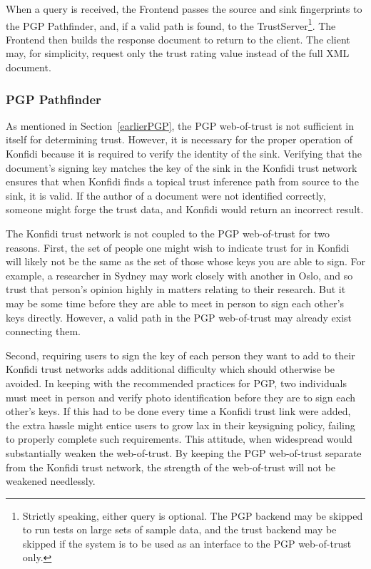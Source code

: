 \documentclass{acm_proc_article-sp}
\begin{document}
When a query is received, the Frontend passes the source and sink fingerprints to the PGP Pathfinder, and, if a valid path is found, to the TrustServer\footnote{Strictly speaking, either query is optional.  The PGP backend may be skipped to run tests on large sets of sample data, and the trust backend may be skipped if the system is to be used as an interface to the PGP web-of-trust only.}.  The Frontend then builds the response document to return to the client.  The client may, for simplicity, request only the trust rating value instead of the full XML document.

\subsubsection{PGP Pathfinder}
As mentioned in Section~\ref{earlierPGP}, the PGP web-of-trust is not sufficient in itself for determining trust.  However, it is necessary for the proper operation of Konfidi because it is required to verify the identity of the sink.  Verifying that the document's signing key matches the key of the sink in the Konfidi trust network ensures that when Konfidi finds a topical trust inference path from source to the sink, it is valid.  If the author of a document were not identified correctly, someone might forge the trust data, and Konfidi would return an incorrect result. 

The Konfidi trust network is not coupled to the PGP web-of-trust for two reasons.  First, the set of people one might wish to indicate trust for in Konfidi will likely not be the same as the set of those whose keys you are able to sign.  For example, a researcher in Sydney may work closely with another in Oslo, and so trust that person's opinion highly in matters relating to their research.  But it may be some time before they are able to meet in person to sign each other's keys directly.  However, a valid path in the PGP web-of-trust may already exist connecting them.  

Second, requiring users to sign the key of each person they want to add to their Konfidi trust networks adds additional difficulty which should otherwise be avoided.  In keeping with the recommended practices for PGP, two individuals must meet in person and verify photo identification before they are to sign each other's keys.  If this had to be done every time a Konfidi trust link were added, the extra hassle might entice users to grow lax in their keysigning policy, failing to properly complete such requirements.  This attitude, when widespread would substantially weaken the web-of-trust.  By keeping the PGP web-of-trust separate from the Konfidi trust network, the strength of the web-of-trust will not be weakened needlessly.
\end{document}
